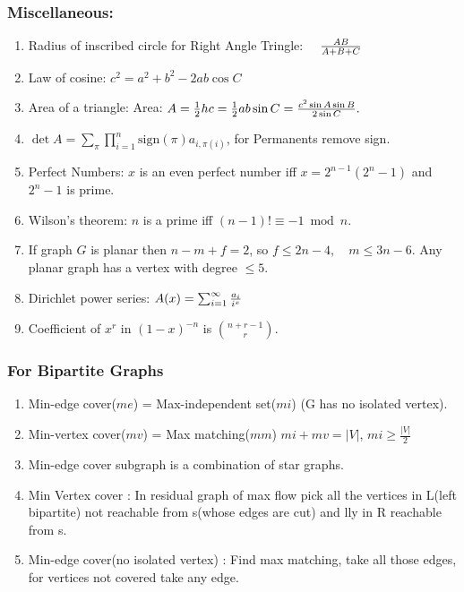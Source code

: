 \documentclass[12pt]{extarticle}
\begin{document}
\begin{multicols*}{2}
			\subsubsection*{Miscellaneous:}
			\begin{enumerate}
				\itemsep0em 
				\item 			Radius of inscribed circle for Right Angle Tringle:
				$\quad {A B \over A + B + C}$
				\item Law of cosine: 			$c^2 = a^2 + b^2 - 2ab \cos C$
				\item Area of a triangle: Area:
				$A = \frac{1}{2} h c
					= \frac{1}{2} a b \sin C
					= {c^2 \sin A \sin B \over 2 \sin C}.$
				\item 			$\det A = \sum_\pi \prod_{i=1}^n \text{sign}(\pi) a_{i,\pi(i)}$, 
				for Permanents remove sign.
				\item Perfect Numbers: $x$ is an even perfect number iff $x = 2^{n-1}(2^n - 1)$ and $2^n - 1$ is prime.
				\item Wilson's theorem: $n$ is a prime iff
				$(n-1)! \equiv -1 \bmod n.$
				\item If graph $G$ is planar then $n - m + f = 2$, so
				$f \leq 2n - 4, \quad m \leq 3 n - 6.$
				Any planar graph has a vertex with degree $\leq 5$.
				\item Dirichlet power series:
				$A(x) =\sum_{i=1}^\infty{a_i \over i^x}$
				\item Coefficient of $x^r$ in $(1-x)^{-n}$ is ${n+r-1}\choose{r}$.
			\end{enumerate}
		\subsubsection*{For Bipartite Graphs}
		\begin{enumerate}
			\itemsep0em 
			\item Min-edge cover($me$) = Max-independent set($mi$) (G has no isolated vertex).
			\item Min-vertex cover($mv$) = Max matching($mm$) \hspace{5mm} $mi + mv = |V|$,\hspace{5mm} $mi \geq \frac{|V|}{2}$
			\item Min-edge cover subgraph is a combination of star graphs.
			\item Min Vertex cover : In residual graph of max flow pick all the vertices in 
			L(left bipartite) not reachable from s(whose edges are cut) and lly in R reachable from s.
			\item Min-edge cover(no isolated vertex) : Find max matching, take all those edges, for vertices not covered
			take any edge.
		\end{enumerate}
		

\end{multicols*}
\end{document}
